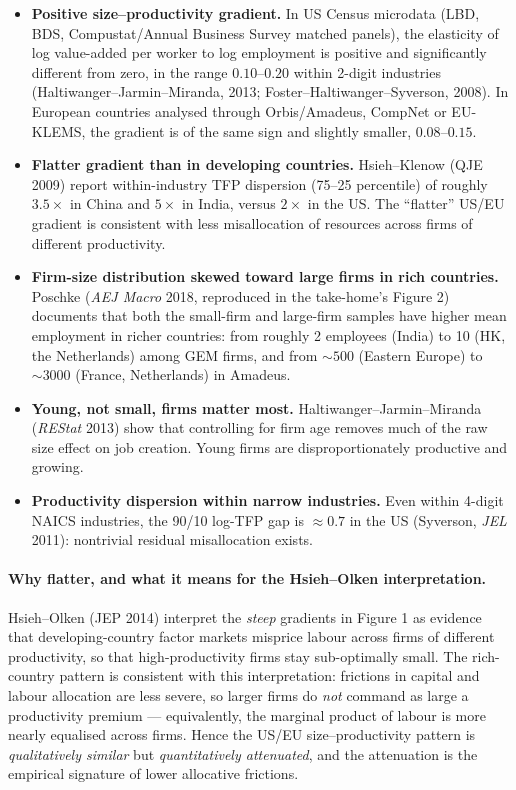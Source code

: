 \documentclass[11pt,a4paper]{article}
\begin{document}
\begin{itemize}[leftmargin=*,itemsep=2pt]
    \item \textbf{Positive size--productivity gradient.} In US Census microdata (LBD, BDS, Compustat/Annual Business Survey matched panels), the elasticity of log value-added per worker to log employment is positive and significantly different from zero, in the range $0.10$--$0.20$ within 2-digit industries (Haltiwanger--Jarmin--Miranda, 2013; Foster--Haltiwanger--Syverson, 2008). In European countries analysed through Orbis/Amadeus, CompNet or EU-KLEMS, the gradient is of the same sign and slightly smaller, $0.08$--$0.15$.
    \item \textbf{Flatter gradient than in developing countries.} Hsieh--Klenow (QJE 2009) report within-industry TFP dispersion (75--25 percentile) of roughly $3.5\times$ in China and $5\times$ in India, versus $2\times$ in the US. The ``flatter'' US/EU gradient is consistent with less misallocation of resources across firms of different productivity.
    \item \textbf{Firm-size distribution skewed toward large firms in rich countries.} Poschke (\emph{AEJ Macro} 2018, reproduced in the take-home's Figure 2) documents that both the small-firm and large-firm samples have higher mean employment in richer countries: from roughly 2 employees (India) to 10 (HK, the Netherlands) among GEM firms, and from $\sim 500$ (Eastern Europe) to $\sim 3000$ (France, Netherlands) in Amadeus.
    \item \textbf{Young, not small, firms matter most.} Haltiwanger--Jarmin--Miranda (\emph{REStat} 2013) show that controlling for firm age removes much of the raw size effect on job creation. Young firms are disproportionately productive and growing.
    \item \textbf{Productivity dispersion within narrow industries.} Even within 4-digit NAICS industries, the 90/10 log-TFP gap is $\approx 0.7$ in the US (Syverson, \emph{JEL} 2011): nontrivial residual misallocation exists.
\end{itemize}

\paragraph{Why flatter, and what it means for the Hsieh--Olken interpretation.}
Hsieh--Olken (JEP 2014) interpret the \emph{steep} gradients in Figure 1 as evidence that developing-country factor markets misprice labour across firms of different productivity, so that high-productivity firms stay sub-optimally small. The rich-country pattern is consistent with this interpretation: frictions in capital and labour allocation are less severe, so larger firms do \emph{not} command as large a productivity premium --- equivalently, the marginal product of labour is more nearly equalised across firms. Hence the US/EU size--productivity pattern is \emph{qualitatively similar} but \emph{quantitatively attenuated}, and the attenuation is the empirical signature of lower allocative frictions.
\end{document}
